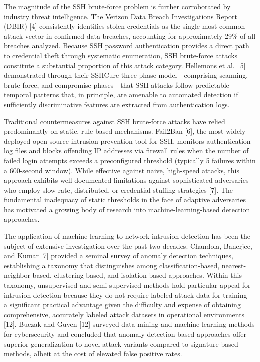 \documentclass[
  a4paper]{report}
\begin{document}
The magnitude of the SSH brute-force problem is further corroborated by
industry threat intelligence. The Verizon Data Breach Investigations
Report (DBIR) {[}4{]} consistently identifies stolen credentials as the
single most common attack vector in confirmed data breaches, accounting
for approximately 29\% of all breaches analyzed. Because SSH password
authentication provides a direct path to credential theft through
systematic enumeration, SSH brute-force attacks constitute a substantial
proportion of this attack category. Hellemons et al.~{[}5{]}
demonstrated through their SSHCure three-phase model---comprising
scanning, brute-force, and compromise phases---that SSH attacks follow
predictable temporal patterns that, in principle, are amenable to
automated detection if sufficiently discriminative features are
extracted from authentication logs.

Traditional countermeasures against SSH brute-force attacks have relied
predominantly on static, rule-based mechanisms. Fail2Ban {[}6{]}, the
most widely deployed open-source intrusion prevention tool for SSH,
monitors authentication log files and blocks offending IP addresses via
firewall rules when the number of failed login attempts exceeds a
preconfigured threshold (typically 5 failures within a 600-second
window). While effective against naive, high-speed attacks, this
approach exhibits well-documented limitations against sophisticated
adversaries who employ slow-rate, distributed, or credential-stuffing
strategies {[}7{]}. The fundamental inadequacy of static thresholds in
the face of adaptive adversaries has motivated a growing body of
research into machine-learning-based detection approaches.

The application of machine learning to network intrusion detection has
been the subject of extensive investigation over the past two decades.
Chandola, Banerjee, and Kumar {[}7{]} provided a seminal survey of
anomaly detection techniques, establishing a taxonomy that distinguishes
among classification-based, nearest-neighbor-based, clustering-based,
and isolation-based approaches. Within this taxonomy, unsupervised and
semi-supervised methods hold particular appeal for intrusion detection
because they do not require labeled attack data for training---a
significant practical advantage given the difficulty and expense of
obtaining comprehensive, accurately labeled attack datasets in
operational environments {[}12{]}. Buczak and Guven {[}12{]} surveyed
data mining and machine learning methods for cybersecurity and concluded
that anomaly-detection-based approaches offer superior generalization to
novel attack variants compared to signature-based methods, albeit at the
cost of elevated false positive rates.
\end{document}

